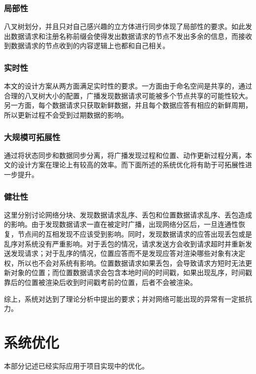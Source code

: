 \subsubsection{局部性}
八叉树划分，并且只对自己感兴趣的立方体进行同步体现了局部性的要求。如此发出数据请求和注册名称前缀会使得发出数据请求的节点不发出多余的信息，而接收到数据请求的节点收到的内容逻辑上也都和自己相关。
\subsubsection{实时性}
本文的设计方案从两方面满足实时性的要求。一方面由于命名空间是共享的，通过合理的八叉树大小的配置，广播发现数据请求可能被多个节点共享的可能性较大。另一方面，每个数据请求只获取新鲜数据，并且每个数据应答有相应的新鲜周期，所以更新过程不会受到过期数据的影响。
\subsubsection{大规模可拓展性}
通过将状态同步和数据同步分离，将广播发现过程和位置、动作更新过程分离，本文的设计方案在理论上有较高的效率。而下面所述的系统优化将有助于可拓展性进一步提升。
\subsubsection{健壮性}
这里分别讨论网络分块、发现数据请求乱序、丢包和位置数据请求乱序、丢包造成的影响。由于发现数据请求一直在被定时广播，出现网络分区后，一旦连通性恢复，节点间的互相发现不应该受到影响。同时，发现数据请求的应答出现丢包或是乱序对系统没有严重影响。对于丢包的情况，请求发送方会收到请求超时并重新发送发现请求；对于乱序的情况，位置应答而不是发现应答对渲染哪些对象有决定权，所以也不会对系统有影响。位置数据请求如果丢包，会导致请求方短时无法更新对象的位置；而位置数据请求会包含本地时间的时间戳，如果出现乱序，时间戳靠后的位置被渲染后收到时间戳考前的位置，后者不会被渲染。
\par
综上，系统对达到了理论分析中提出的要求；并对网络可能出现的异常有一定抵抗力。
\section{系统优化}
\label{OptimizationSection}
\par
本部分记述已经实际应用于项目实现中的优化。
